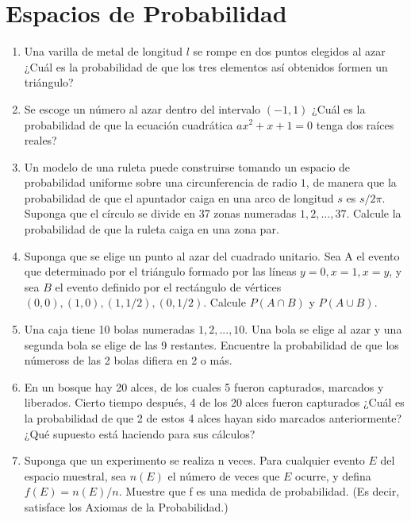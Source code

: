 \section{Espacios de Probabilidad}

\begin{enumerate}
		\item Una varilla de metal de longitud $l$ se rompe en dos puntos elegidos al azar ¿Cuál es la probabilidad de que los tres elementos así obtenidos formen un triángulo?

\item Se escoge un número al azar dentro del intervalo $(-1,1)$ ¿Cuál es la probabilidad de que la ecuación cuadrática $ax^2 + x + 1 = 0$ tenga dos raíces reales?

\item Un modelo de una ruleta puede construirse tomando un espacio de probabilidad uniforme sobre una circunferencia de radio $1$, de manera que la probabilidad de que el apuntador caiga en una arco de longitud $s$ es $s/2\pi$. Suponga que el círculo se divide en 37 zonas numeradas $1, 2, . . . , 37$. Calcule la probabilidad de que la ruleta caiga en una zona par.

\item Suponga que se elige un punto al azar del cuadrado unitario. Sea A el evento que determinado por el triángulo formado por las líneas $y = 0, x = 1, x = y$, y sea $B$ el evento definido por el rectángulo de vértices $(0, 0), (1, 0), (1, 1/2), (0, 1/2)$. Calcule $P(A \cap B)$ y $P(A \cup B)$.

\item Una caja tiene 10 bolas numeradas $1, 2, . . . , 10$. Una bola se elige al azar y una segunda bola se elige de las 9 restantes. Encuentre la probabilidad de que los númeross de las 2 bolas difiera en 2 o más.

\item En un bosque hay 20 alces, de los cuales 5 fueron capturados, marcados y liberados. Cierto tiempo después, 4 de los 20 alces fueron capturados ¿Cuál es la probabilidad de que 2 de estos 4 alces hayan sido marcados anteriormente? ¿Qué supuesto está haciendo para sus cálculos?

\item Suponga que un experimento se realiza n veces. Para cualquier evento $E$ del espacio muestral, sea $n(E)$ el número de veces que $E$ ocurre, y defina $f(E) = n(E)/n$. Muestre que f es una medida de probabilidad. (Es decir, satisface los Axiomas de la Probabilidad.)


\end{enumerate}
